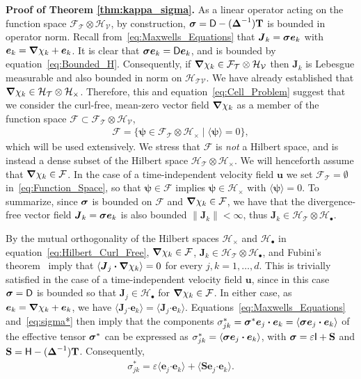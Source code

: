 \documentclass[leqno,onefignum,onetabnum]{siamltex1213}
\newcommand{\Tb}{\mathbf{T}}
\newcommand{\Sb}{\mathbf{S}}
\newcommand{\Tc}{\mathcal{T}}
\newcommand{\Vc}{\mathcal{V}}
\newcommand{\Hc}{\mathcal{H}}
\newcommand{\Fc}{\mathcal{F}}
\newcommand{\Dm}{\mathsf{D}}
\newcommand{\Hm}{\mathsf{H}}
\newcommand{\Ib}{\mathsf{I}}
\newcommand\bsig{\mbox{\boldmath${\sigma}$}}
\newcommand\bDelta{\mbox{\boldmath${\Delta}$}}
\newcommand\bnabla{\mbox{\boldmath${\nabla}$}}
\providecommand\bcdot{\boldsymbol{\cdot}}
\newcommand{\vecJ}{\boldsymbol{J}}
\newcommand{\vecu}{\boldsymbol{u}}
\newcommand{\vece}{\boldsymbol{e}}
\newcommand{\vecpsi}{\boldsymbol{\psi}}
\begin{document}
\textbf{Proof of Theorem \ref{thm:kappa_sigma}.}\hspace{1ex}
%
As a linear operator acting on the function space
$\Fc_{\Tc}\otimes\Hc_{\Vc}$, by construction,
$\bsig=\Dm-(\bDelta^{-1})\Tb$ is bounded in operator norm. Recall
from~\eqref{eq:Maxwells_Equations} that $\vecJ_k=\bsig\vece _k$
with $\vece _k=\bnabla \chi_k+\vece _k$. It is clear that
$\bsig\vece _k=\Dm\vece _k$, and is bounded by
equation~\eqref{eq:Bounded_H}. Consequently, if 
$\bnabla \chi_k\in\Fc_{\Tc}\otimes\Hc_{\Vc}$ then  
$\vecJ_k$ is Lebesgue measurable and also bounded in norm on 
$\Hc_{\Tc\Vc}$. We have already established that 
$\bnabla \chi_k\in\Hc_{\Tc}\otimes\Hc_\times$. Therefore, this and
equation~\eqref{eq:Cell_Problem} suggest that we consider the
curl-free, 
mean-zero vector field $\bnabla \chi_k$ as a member of the function space
$\Fc\subset\Fc_{\Tc}\otimes\Hc_{\Vc}$,         
%
\begin{align}\label{eq:Function_Space}
  \Fc=\{\vecpsi\in\Fc_{\Tc}\otimes\Hc_\times \;|\; \langle\vecpsi\rangle=0\},  
\end{align}
%
which will be used extensively. We
stress that $\Fc$ is \emph{not} a Hilbert space, and is instead a
dense subset of the Hilbert space $\Hc_{\Tc}\otimes\Hc_\times$. We will
henceforth assume that $\bnabla \chi_k\in\Fc$. In the case of a
time-independent velocity field $\vecu $ we set $\Fc_{\Tc}=\emptyset$
in~\eqref{eq:Function_Space}, so that $\vecpsi\in\Fc$ implies  
$\vecpsi\in\Hc_\times$ with $\langle\vecpsi\rangle=0$. To summarize, since $\bsig$ is
bounded on $\Fc$ and $\bnabla \chi_k\in\Fc$, we have that the
divergence-free vector field $\vecJ_k=\bsig\vece _k$ is also
bounded $\|\vecJ_k\|<\infty$, thus $\vecJ_k\in\Hc_{\Tc}\otimes\Hc_\bullet$.  






By the mutual orthogonality of the Hilbert spaces $\Hc_\times$ and $\Hc_\bullet$
in equation~\eqref{eq:Hilbert_Curl_Free}, 
$\bnabla \chi_k\in\Fc$, $\vecJ_k\in\Hc_{\Tc}\otimes\Hc_\bullet$, and Fubini's
theorem~\cite{Folland:99:RealAnalysis} imply that $\langle\vecJ_j\bcdot\bnabla \chi_k\rangle=0$
for every 
$j,k=1,\ldots,d$. This is trivially 
satisfied in the case of a time-independent velocity field $\vecu $,
since in this case $\bsig=\Dm$ is bounded so that
$\vecJ_j\in\Hc_\bullet$ for $\bnabla \chi_k\in\Fc$. In either case, as
$\vece _k=\bnabla \chi_k+\vece _k$, we have
$\langle\vecJ_j\bcdot\vece _k\rangle=\langle\vecJ_j\bcdot\vece
_k\rangle$. Equations~\eqref{eq:Maxwells_Equations} and~\eqref{eq:sigma*}
then imply that 
the components
$\sigma^*_{jk}=\bsig^*\vece _j\bcdot\vece _k=\langle\bsig\vece _j\bcdot\vece _k\rangle$ of 
the effective tensor $\bsig^*$ can be expressed as
$\sigma^*_{jk}=\langle\bsig\vece _j\bcdot\vece _k\rangle$, with $\bsig=\varepsilon\Ib+\Sb$ and
$\Sb=\Hm-(\bDelta^{-1})\Tb$. Consequently,      
%
\begin{align}\label{eq:Reduction}
  \sigma^*_{jk} %
       =\varepsilon\langle\vece _j\bcdot\vece _k\rangle+\langle\Sb\vece _j\bcdot\vece _k\rangle.      
\end{align}
%
\end{document}
